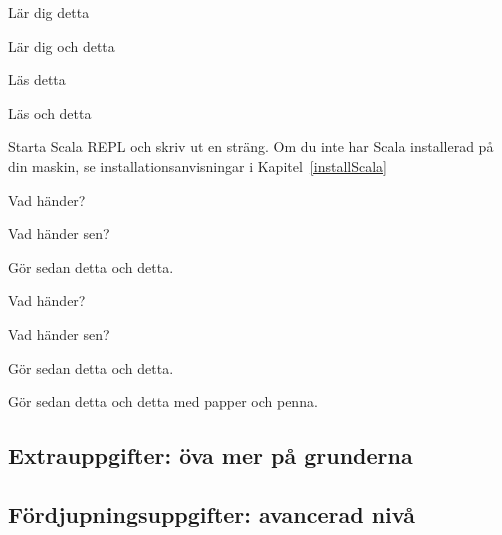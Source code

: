 

\begin{Goals}
\item Lär dig detta
\item Lär dig och detta
\end{Goals}

\begin{Preparations}
\item Läs detta
\item Läs och detta
\end{Preparations}

\BasicTasks


\Task Starta Scala REPL och skriv ut en sträng. Om du inte har Scala installerad på din maskin, se installationsanvisningar i Kapitel~\ref{installScala}


\Subtask Vad händer?

\Subtask Vad händer sen?


\Task Gör sedan detta och detta. 

\Subtask Vad händer?

\Subtask Vad händer sen?

\Task Gör sedan detta och detta. 

\TaskPen Gör sedan detta och detta med papper och penna.

\lipsum[7]

\subsection{Extrauppgifter: öva mer på grunderna}
\lipsum[2]


\subsection{Fördjupningsuppgifter: avancerad nivå}
\lipsum[2]